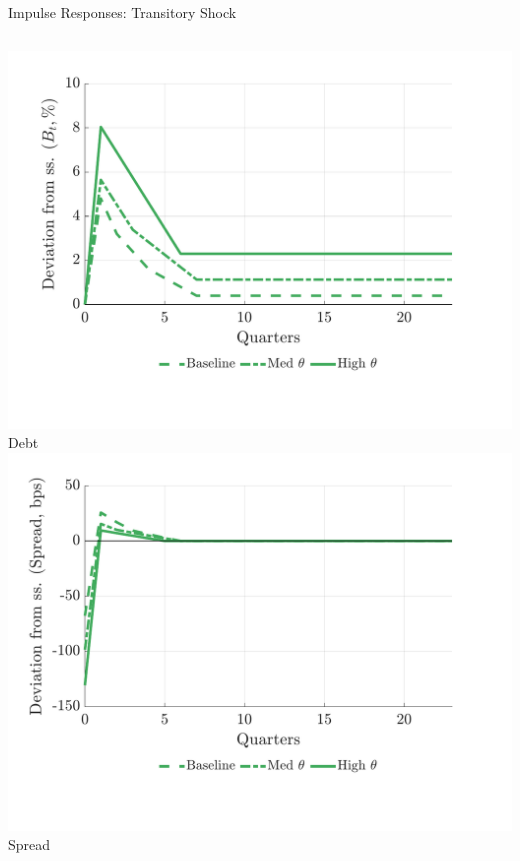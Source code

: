 \documentclass[aspectratio=169,11pt,professionalfonts]{beamer}
\newcommand{\1}{\mathbb{1}}
\begin{document}
\begin{frame}{Impulse Responses: Transitory Shock}
\begin{columns}[T,onlytextwidth]
    \includegraphics[width=\linewidth]{comparison_figure_14.pdf}\\[-0.5em]
    {\scriptsize Debt}
    \includegraphics[width=\linewidth]{comparison_figure_16.pdf}\\[-0.5em]
    {\scriptsize Spread}
  \end{columns}
\end{frame}
\end{document}
